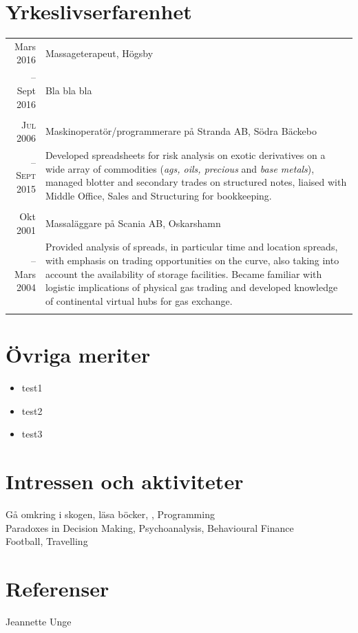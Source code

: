 \documentclass[11pt,a4paper]{article}
\begin{document}
\section{Yrkeslivserfarenhet}
\begin{tabularx}{\textwidth}{r|X}	
	Mars 2016 & Massageterapeut, Högsby \\
	-- Sept 2016&\footnotesize{Bla bla bla}\\
	\multicolumn{2}{c}{} \\

	\textsc{Jul 2006} & Maskinoperatör/programmerare på Stranda AB, Södra Bäckebo \\
	-- \textsc{Sept 2015}&\footnotesize{Developed spreadsheets for risk analysis on exotic derivatives on a wide array of commodities (\textit{ags, oils, precious} and \textit{base metals}), managed blotter and secondary trades on structured notes, liaised with Middle Office, Sales and Structuring for bookkeeping.}\\
	\multicolumn{2}{c}{} \\
	
	Okt 2001 & Massaläggare på Scania AB, Oskarshamn \\
	-- Mars 2004&\footnotesize{Provided analysis of spreads, in particular time and location spreads, with emphasis on trading opportunities on the curve, also taking into account the availability of storage facilities. Became familiar with logistic implications of physical gas trading and developed knowledge of continental virtual hubs for gas exchange.}\\
	\multicolumn{2}{c}{} \\

\end{tabularx}

\section{Övriga meriter}
\begin{itemize}
	\item test1
	\item test2
	\item test3
\end{itemize}

\section{Intressen och aktiviteter}
Gå omkring i skogen, läsa böcker, , Programming\\
Paradoxes in Decision Making, Psychoanalysis, Behavioural Finance\\
Football, Travelling

\section{Referenser}
Jeannette Unge
\end{document}
